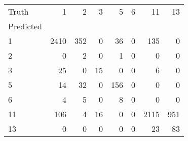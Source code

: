 \begin{tabular}{lrrrrrrr}
\toprule
Truth & 1 & 2 & 3 & 5 & 6 & 11 & 13 \\
Predicted &  &  &  &  &  &  &  \\
\midrule
1 & 2410 & 352 & 0 & 36 & 0 & 135 & 0 \\
2 & 0 & 2 & 0 & 1 & 0 & 0 & 0 \\
3 & 25 & 0 & 15 & 0 & 0 & 6 & 0 \\
5 & 14 & 32 & 0 & 156 & 0 & 0 & 0 \\
6 & 4 & 5 & 0 & 8 & 0 & 0 & 0 \\
11 & 106 & 4 & 16 & 0 & 0 & 2115 & 951 \\
13 & 0 & 0 & 0 & 0 & 0 & 23 & 83 \\
\bottomrule
\end{tabular}
